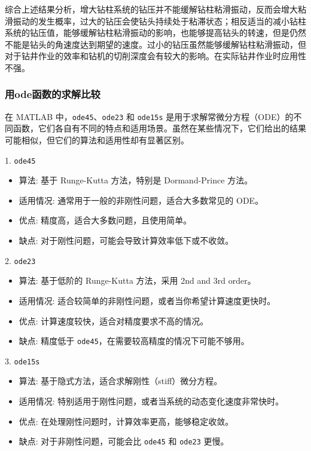 \documentclass[12pt,hyperref,a4paper,UTF8]{ctexart}
\begin{document}
	综合上述结果分析，增大钻柱系统的钻压并不能缓解钻柱粘滑振动，反而会增大粘滑振动的发生概率，过大的钻压会使钻头持续处于粘滞状态；相反适当的减小钻柱系统的钻压值，能够缓解钻柱粘滑振动的影响，也能够提高钻头的转速，但是仍然不能是钻头的角速度达到期望的速度。过小的钻压虽然能够缓解钻柱粘滑振动，但对于钻井作业的效率和钻机的切削深度会有较大的影响。在实际钻井作业时应用性不强。
	
	\subsubsection{用ode函数的求解比较}
	
	
	
	在 MATLAB 中，\texttt{ode45}、\texttt{ode23} 和 \texttt{ode15s} 是用于求解常微分方程（ODE）的不同函数，它们各自有不同的特点和适用场景。虽然在某些情况下，它们给出的结果可能相似，但它们的算法和适用性却有显著区别。%
	
	1. \texttt{ode45}  
	\begin{itemize}  
		\item 算法: 基于 Runge-Kutta 方法，特别是 Dormand-Prince 方法。  
		\item 适用情况: 通常用于一般的非刚性问题，适合大多数常见的 ODE。  
		\item 优点: 精度高，适合大多数问题，且使用简单。  
		\item 缺点: 对于刚性问题，可能会导致计算效率低下或不收敛。  
	\end{itemize}  
	
	2. \texttt{ode23}  
	\begin{itemize}  
		\item 算法: 基于低阶的 Runge-Kutta 方法，采用 2nd and 3rd order。  
		\item 适用情况: 适合较简单的非刚性问题，或者当你希望计算速度更快时。  
		\item 优点: 计算速度较快，适合对精度要求不高的情况。  
		\item 缺点: 精度低于 \texttt{ode45}，在需要较高精度的情况下可能不够用。  
	\end{itemize}  
	
	3. \texttt{ode15s}  
	\begin{itemize}  
		\item 算法: 基于隐式方法，适合求解刚性（stiff）微分方程。  
		\item 适用情况: 特别适用于刚性问题，或者当系统的动态变化速度非常快时。  
		\item 优点: 在处理刚性问题时，计算效率更高，能够稳定收敛。  
		\item 缺点: 对于非刚性问题，可能会比 \texttt{ode45} 和 \texttt{ode23} 更慢。  
	\end{itemize}
	
\end{document}
